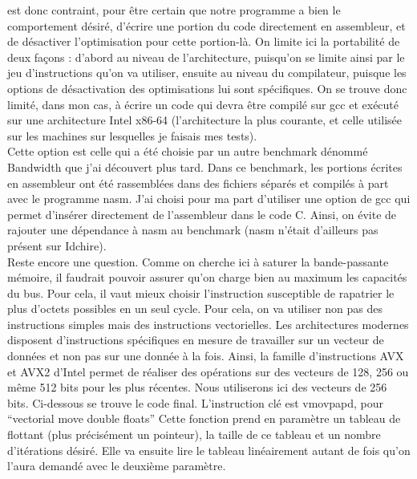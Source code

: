 \documentclass{report}
\begin{document}
est donc contraint, pour être certain que notre programme a bien le comportement désiré, d'écrire une
portion du code directement en assembleur, et de désactiver l'optimisation pour cette portion-là. On
limite ici la portabilité de deux façons : d'abord au niveau de l'architecture, puisqu'on se limite ainsi
par le jeu d'instructions qu'on va utiliser, ensuite au niveau du compilateur, puisque les options 
de désactivation des optimisations lui sont spécifiques. On se trouve donc limité, dans mon cas,
à écrire un code qui devra être compilé sur gcc et exécuté sur une architecture Intel x86-64 
(l'architecture la plus courante, et celle utilisée sur les machines sur lesquelles je faisais mes tests).
\\Cette option est celle qui a été choisie par un autre benchmark dénommé Bandwidth\cite{bandwidth} que 
j'ai découvert plus tard. Dans ce benchmark, les portions écrites en assembleur ont été rassemblées dans
des fichiers séparés et compilés à part avec le programme nasm. J'ai choisi pour ma part d'utiliser 
une option de gcc qui permet d'insérer directement de l'assembleur dans le code C. Ainsi, on évite
de rajouter une dépendance à nasm au benchmark (nasm n'était d'ailleurs pas présent sur Idchire).
\\Reste encore une question. Comme on cherche ici à saturer la bande-passante mémoire, il faudrait
pouvoir assurer qu'on charge bien au maximum les capacités du bus. Pour cela, il vaut mieux choisir
l'instruction susceptible de rapatrier le plus d'octets possibles en un seul cycle. Pour cela, on va 
utiliser non pas des instructions simples mais des instructions vectorielles. Les architectures modernes
disposent d'instructions spécifiques en mesure de travailler sur un vecteur de données et non pas sur
une donnée à la fois. Ainsi, la famille d'instructions AVX et AVX2 d'Intel permet de réaliser des 
opérations sur des vecteurs de 128, 256 ou même 512 bits pour les plus récentes. Nous utiliserons
ici des vecteurs de 256 bits. Ci-dessous se trouve le code final. L'instruction clé est vmovpapd, pour
``vectorial move double floats''
Cette fonction prend en paramètre un tableau de flottant (plus précisément un pointeur), la taille de 
ce tableau et un nombre d'itérations désiré. Elle va ensuite lire le tableau linéairement autant de fois
qu'on l'aura demandé avec le deuxième paramètre.
\end{document}
